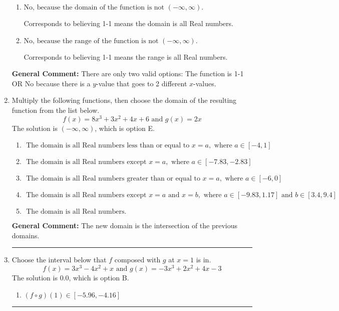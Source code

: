 \documentclass{extbook}[14pt]
\newcommand{\litem}[1]{\item #1

\rule{\textwidth}{0.4pt}}
\begin{document}
\begin{enumerate}
{\begin{enumerate}[label=\Alph*.]
Corresponds to the Vertical Line test, which checks if an expression is a function.
\item \( \text{No, because the domain of the function is not $(-\infty, \infty)$.} \)

Corresponds to believing 1-1 means the domain is all Real numbers.
\item \( \text{No, because the range of the function is not $(-\infty, \infty)$.} \)

Corresponds to believing 1-1 means the range is all Real numbers.
\end{enumerate}

\textbf{General Comment:} There are only two valid options: The function is 1-1 OR No because there is a $y$-value that goes to 2 different $x$-values.
}
\litem{
Multiply the following functions, then choose the domain of the resulting function from the list below.
\[ f(x) = 8x^{3} +3 x^{2} +4 x + 6 \text{ and } g(x) = 2x \]The solution is \( (-\infty, \infty) \), which is option E.\begin{enumerate}[label=\Alph*.]
\item \( \text{ The domain is all Real numbers less than or equal to } x = a, \text{ where } a \in [-4, 1] \)


\item \( \text{ The domain is all Real numbers except } x = a, \text{ where } a \in [-7.83, -2.83] \)


\item \( \text{ The domain is all Real numbers greater than or equal to } x = a, \text{ where } a \in [-6, 0] \)


\item \( \text{ The domain is all Real numbers except } x = a \text{ and } x = b, \text{ where } a \in [-9.83, 1.17] \text{ and } b \in [3.4, 9.4] \)


\item \( \text{ The domain is all Real numbers. } \)


\end{enumerate}

\textbf{General Comment:} The new domain is the intersection of the previous domains.
}
\litem{
Choose the interval below that $f$ composed with $g$ at $x=1$ is in.
\[ f(x) = 3x^{3} -4 x^{2} +x \text{ and } g(x) = -3x^{3} +2 x^{2} +4 x -3 \]The solution is \( 0.0 \), which is option B.\begin{enumerate}[label=\Alph*.]
\item \( (f \circ g)(1) \in [-5.96, -4.16] \)


\end{enumerate}}
\end{enumerate}
\end{document}

